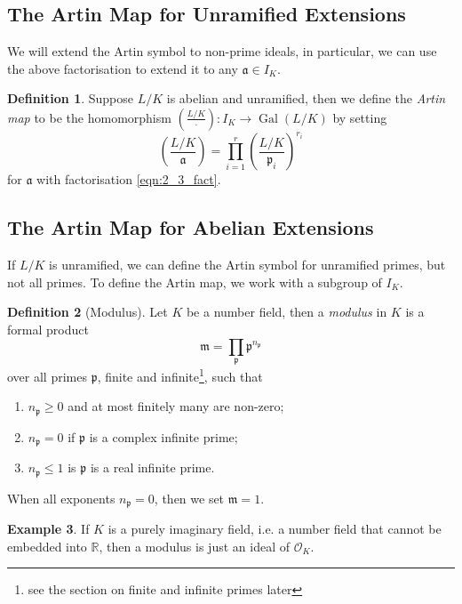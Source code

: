 \documentclass[11pt]{article}
\theoremstyle{definition}
\newtheorem{definition}{Definition}[section]
\newtheorem{example}[definition]{Example}
\theoremstyle{plain}
\theoremstyle{remark}
\DeclareMathOperator{\Gal}{Gal}
\newcommand{\RR}{\mathbb{R}}
\newcommand{\cO}{\mathcal{O}}
\newcommand{\fa}{\mathfrak{a}}
\newcommand{\fp}{\mathfrak{p}}
\newcommand{\fm}{\mathfrak{m}}
\newcommand{\leg}[2]{\left(\frac{#1}{#2}\right)}
\begin{document}
\subsection{The Artin Map for Unramified Extensions}
We will extend the Artin symbol to non-prime ideals, in particular, we can use the above factorisation to extend it to any $\fa \in I_K$.

\begin{definition}\label{def:2_4}
    Suppose $L/K$ is abelian and unramified, then we define the \emph{Artin map} to be the homomorphism $\leg{L/K}{\cdot} : I_K \to \Gal(L/K)$ by setting
    \begin{equation}\label{eqn:2_4_star}
        \leg{L/K}{\fa} = \prod_{i=1}^r \leg{L/K}{\fp_i}^{r_i}
    \end{equation}
    for $\fa$ with factorisation \eqref{eqn:2_3_fact}.
\end{definition}

\subsection{The Artin Map for Abelian Extensions}

If $L/K$ is unramified, we can define the Artin symbol for unramified primes, but not all primes. To define the Artin map, we work with a subgroup of $I_K$.

\begin{definition}[Modulus]\label{def:2_5}
    Let $K$ be a number field, then a \emph{modulus} in $K$ is a formal product
    \begin{equation*}
        \fm = \prod_\fp \fp^{n_\fp}
    \end{equation*}
    over all primes $\fp$, finite and infinite\footnote{see the section on finite and infinite primes later}, such that
    \begin{enumerate}
        \item $n_\fp \ge 0$ and at most finitely many are non-zero;
        \item $n_\fp = 0$ if $\fp$ is a complex infinite prime;
        \item $n_\fp \le 1$ is $\fp$ is a real infinite prime.
    \end{enumerate}
    When all exponents $n_\fp = 0$, then we set $\fm = 1$.
\end{definition}

\begin{example}\label{eg:2_6}
    If $K$ is a purely imaginary field, i.e. a number field that cannot be embedded into $\RR$, then a modulus is just an ideal of $\cO_K$.
\end{example}
\end{document}
